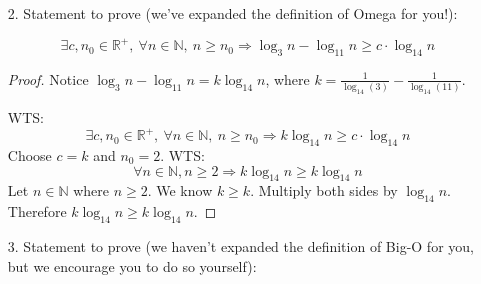 \documentclass[fontsize=11pt]{article}
\newcommand{\N}{\mathbb{N}}
\newcommand{\Z}{\mathbb{Z}}
\newcommand{\R}{\mathbb{R}}
\begin{document}
\begin{enumerate}
\begin{proof}
\begin{enumerate}
    \item[3.] Proving for $\forall e \in \N, e | (a + kn) \land e | n \implies e \le 1$ \\
        Let $e \in \N$ \\
        Suppose $e | (a + kn) \land e | n$ \\
        $a + kn = ex \land n = ey$ for some $x,y \in \Z$ \\
        $a + key = ex$ for some $x,y \in \Z$ \\
        $a = e(x - ky)$ for some $x,y \in \Z$ \\
        Let $c = (x - ky)$ \\
        By substitution, we now have: $a = ec$ \\
        Therefore, $\exists c \in \Z$ s.t. $a = ec$ is true. \\
        Which means $e | a$ is true. \\
        Since we are given $\forall e_2 \in \N, e_2 | a \land e_2 | n \implies e_2 \le 1$ \\
        Take $e_2 = e$, we now have $e | a \land e | n \implies e \le 1$ \\
        And since we now know $e | a$ and $e | n$, we can conclude $e \le 1$. \\
        Which is what we want to show.
\end{enumerate}


\end{proof}

\item[2.] Statement to prove (we've expanded the definition of Omega for you!):

$$\exists c, n_0 \in \R^+,~ \forall n \in \N,~ n \geq n_0 \Rightarrow \log_{3} n - \log_{11} n \geq c \cdot \log_{14} n$$

\begin{proof}
Notice $\log_3n - \log_{11}n = k\log_{14}n$, where $k = \frac{1}{\log_{14}(3)} - \frac{1}{\log_{14}(11)}$.

WTS: $$\exists c, n_0 \in \R^+,~ \forall n \in \N,~ n \geq n_0 \Rightarrow k\log_{14}n \geq c \cdot \log_{14} n$$
Choose $c = k$ and $n_0 = 2$.
WTS: $$\forall n \in \N, n \geq 2 \Rightarrow k\log_{14}n \geq k\log_{14}n$$
Let $n \in \N$ where $n \geq 2$.
We know $k \geq k$. Multiply both sides by $\log_{14}n$.
Therefore $k\log_{14}n \geq k\log_{14}n$.
\end{proof}

\item[3.] Statement to prove (we haven't expanded the definition of Big-O for you, but we encourage you to do so yourself):


\end{enumerate}
\end{document}
